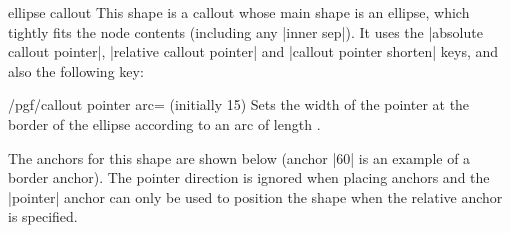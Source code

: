 \begin{shape}{ellipse callout}
    This shape is a callout whose main shape is an ellipse, which tightly fits
    the node contents (including any |inner sep|). It uses the
    |absolute callout pointer|, |relative callout pointer| and
    |callout pointer shorten| keys, and also the following key:

    \begin{key}{/pgf/callout pointer arc= (initially 15)}
        Sets the width of the pointer at the border of the ellipse according to
        an arc of length .
    \end{key}

    The anchors for this shape are shown below (anchor |60| is an example of a
    border anchor). The pointer direction is ignored when placing anchors and
    the |pointer| anchor can only be used to position the shape when the
    relative anchor is specified.
\begin{codeexample}[preamble={\usetikzlibrary{shapes.callouts}}]
\Huge
{}
\end{codeexample}
\end{shape}

